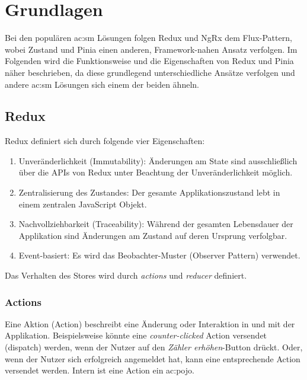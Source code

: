 \chapter{Grundlagen} \label{sm-ansaetze}

Bei den populären \acrshort{ac:sm} Lösungen folgen Redux und NgRx dem Flux-Pattern\cite{historyOfRedux}\cite{ngrxGettingStarted}, wobei Zustand und Pinia einen anderen, Framework-nahen Ansatz verfolgen. Im Folgenden wird die Funktionsweise und die Eigenschaften von Redux und Pinia näher beschrieben, da diese grundlegend unterschiedliche Ansätze verfolgen und andere \acrshort{ac:sm} Lösungen sich einem der beiden ähneln.

\section{Redux}

Redux definiert sich durch folgende vier Eigenschaften:
\begin{enumerate}
  \item Unveränderlichkeit (Immutability): Änderungen am State sind ausschließlich über die APIs von Redux unter Beachtung der Unveränderlichkeit möglich.
  \item Zentralisierung des Zustandes: Der gesamte Applikationszustand lebt in einem zentralen JavaScript Objekt.
  \item Nachvollziehbarkeit (Traceability): Während der gesamten Lebensdauer der Applikation sind Änderungen am Zustand auf deren Ursprung verfolgbar.
  \item Event-basiert: Es wird das Beobachter-Muster (Observer Pattern) verwendet.
\end{enumerate}

Das Verhalten des Stores wird durch \textit{actions} und \textit{reducer} definiert.

\subsection{Actions}

Eine Aktion (Action) beschreibt eine Änderung oder Interaktion in und mit der Applikation. Beispielsweise könnte eine \textit{counter-clicked} Action versendet (dispatch) werden, wenn der Nutzer auf den \textit{Zähler erhöhen}-Button drückt. Oder, wenn der Nutzer sich erfolgreich angemeldet hat, kann eine entsprechende Action versendet werden. Intern ist eine Action ein \acrshort{ac:pojo}.\cite{reduxStateActionReducers}


